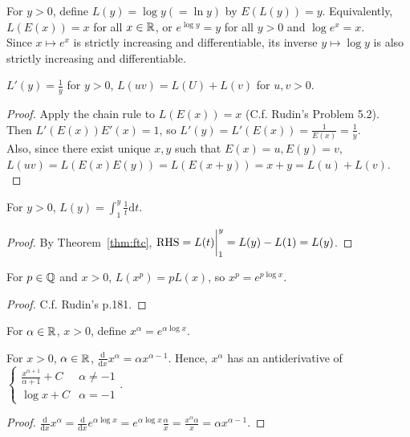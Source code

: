 \begin{define}
	For $y>0$, define $L(y)=\log{y}(= \ln{y})$ by $E(L(y))=y$.
	Equivalently, $L(E(x))=x$ for all $x \in \mathbb{R}$, or
	$e^{\log{y}}=y$ for all $y>0$ and $\log{e^{x}}=x$.\\
	Since $x \mapsto e^{x}$ is strictly increasing and differentiable,
	its inverse $y \mapsto \log{y}$ is also strictly increasing and differentiable.\\
\end{define}
\begin{thm*}
	$L'(y)=\frac{1}{y}$ for $y>0$, $L(uv)=L(U)+L(v)$ for $u,v>0$.
	\begin{proof}
		Apply the chain rule to $L(E(x))=x$ (C.f. Rudin's Problem 5.2).\\
		Then $L'(E(x))E'(x)=1$, so $L'(y)=L'(E(x))=\frac{1}{E(x)}=\frac{1}{y}$.\\
		Also, since there exist unique $x,y$ such that $E(x)=u,E(y)=v$, $L(uv)=L(E(x)E(y))=L(E(x+y))=x+y=L(u)+L(v)$.\\
	\end{proof}
\end{thm*}
\begin{corollary*}
	For $y>0$, $L(y)= \int_{1}^{y}{\frac{1}{t}\mathrm{d}t}$.
	\begin{proof}
		By Theorem~\ref{thm:ftc},
		$\text{RHS} = L(t)\bigg{\rvert}_{1}^{y}=L(y)-L(1)=L(y)$.
	\end{proof}
\end{corollary*}

\begin{thm*}
	For $p \in \mathbb{Q}$ and $x>0$, $L(x^{p})=pL(x)$, so $x^{p}=e^{p \log{x}}$.
	\begin{proof}
		C.f. Rudin's p.181.
	\end{proof}
\end{thm*}

\begin{define}
	For $\alpha \in \mathbb{R}$, $x>0$, define $x^{\alpha}=e^{\alpha \log{x}}$.
\end{define}
\begin{thm}
	For $x>0$, $\alpha \in \mathbb{R}$, $\frac{\mathrm{d}}{\mathrm{d}x} x^{\alpha}=\alpha x^{\alpha-1}$.
	Hence, $x^{\alpha}$ has an antiderivative of $\begin{cases}
			\frac{x^{\alpha+1}}{\alpha+1}+C & \alpha \neq -1 \\
			\log{x}+C                       & \alpha=-1
		\end{cases}$.
	\begin{proof}
		$\frac{\mathrm{d}}{\mathrm{d}x}x^{\alpha}=\frac{\mathrm{d}}{\mathrm{d}x}e^{\alpha \log{x}}=e^{\alpha \log{x}}\frac{\alpha}{x}=\frac{x^{\alpha}\alpha}{x}=\alpha x^{\alpha-1}$.
	\end{proof}
\end{thm}

